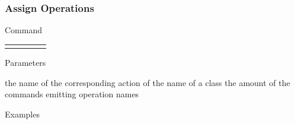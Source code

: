 \documentclass[9pt]{beamer}
\begin{document}
\begin{frame}[t] \frametitle{Assign Operations}

	\begin{block}{Command} 
		\begin{tabularx}{\textwidth}{@{}l@{}l@{}l@{}l@{}R}
			 &
				 &
				 &
				 & \InstrItem
		\end{tabularx}
	\end{block}

	\begin{block}{Parameters} \begin{itemize}
		    the name of the corresponding action of 
		     the name of a class
		    the amount of the commands emitting operation names
	\end{itemize} \end{block}

	\begin{block}{Examples}
	\end{block}

\end{frame}
\end{document}
